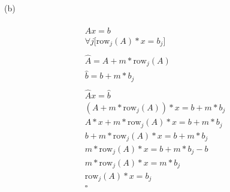 \documentclass[10pt,a4paper]{article}
\begin{document}
	\\
	(b)\\
	\\
	\begin{align*}
	Ax = b\\
	\forall{j} \big[ \text{row}_j(A) * x = b_j \big]\\
	\\
	\hat{A} = A + m*\text{row}_j(A)\\
	\hat{b} = b + m*b_j\\	
	\\
	\hat{A}x = \hat{b}\\
	(A + m*\text{row}_j(A))*x = b + m*b_j\\
	A*x + m*\text{row}_j(A)*x = b + m*b_j\\
	b + m*\text{row}_j(A)*x = b + m*b_j\\
	m*\text{row}_j(A)*x = b + m*b_j - b\\
	m*\text{row}_j(A)*x = m*b_j\\		
	\text{row}_j(A)*x = b_j\\
	\square	
	\end{align*} 	
\end{document}

